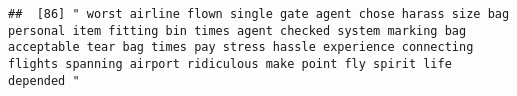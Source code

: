 \documentclass[
]{article}
\begin{document}
\begin{verbatim}
##  [86] " worst airline flown single gate agent chose harass size bag personal item fitting bin times agent checked system marking bag acceptable tear bag times pay stress hassle experience connecting flights spanning airport ridiculous make point fly spirit life depended "                                                                                                                                                                                                                                                                                                                                                                                                                                                                                                                                                                                                                                                                                                                                                                                                                                                                                                                                                                                                                                                                                                                                                                                                                                                                                                                                                                                                                                                                                                                      

\end{verbatim}
\end{document}
